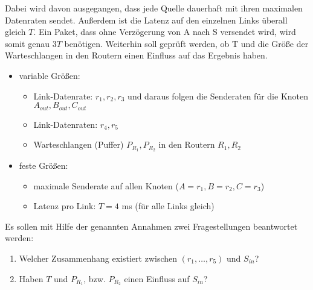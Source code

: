 \documentclass [10pt,a4paper]{article}
\begin{document}
		Dabei wird davon ausgegangen, dass jede Quelle dauerhaft mit ihren maximalen Datenraten sendet. Außerdem ist die Latenz auf den einzelnen Links überall gleich $T$. Ein Paket, dass ohne Verzögerung von A nach S versendet wird, wird somit genau $3T$ benötigen. Weiterhin soll geprüft werden, ob T und die Größe der Warteschlangen in den Routern einen Einfluss auf das Ergebnis haben.
		\begin{itemize}
			\item variable Größen:
			\begin{itemize}
				\item Link-Datenrate: $r_1,r_2,r_3$ und daraus folgen die Senderaten für die Knoten $A_{out},B_{out},C_{out}$
				\item Link-Datenraten: $r_4 ,r_5$
				\item Warteschlangen (Puffer) $P_{R_1},P_{R_2}$ in den Routern $R_1,R_2$
			\end{itemize}
			\item feste Größen:
			\begin{itemize}
				\item maximale Senderate auf allen Knoten ($A=r_1, B=r_2, C=r_3$)
				\item Latenz pro Link: $T=4$ ms (für alle Links gleich)
			\end{itemize}
		\end{itemize}
		
		Es sollen mit Hilfe der genannten Annahmen zwei Fragestellungen beantwortet werden:
		\begin{enumerate}
			\item Welcher Zusammenhang existiert zwischen $(r_1,\dots ,r_5)$ und $S_{in}$?
			\item Haben $T$ und $P_{R_1}$, bzw. $P_{R_2}$ einen Einfluss auf $S_{in}$?
		\end{enumerate}
		
	
\end{document}
